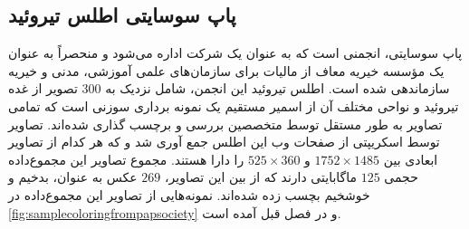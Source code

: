 \subsection{پاپ سوسایتی اطلس تیروئید}\label{subsec:پاپ-سوسایتی}
پاپ سوسایتی، انجمنی است که به عنوان یک شرکت اداره می‌شود و منحصراً به عنوان یک مؤسسه خیریه معاف از مالیات برای سازمان‌های علمی آموزشی، مدنی و خیریه سازماندهی شده است.
اطلس تیروئید این انجمن\cite{papsocietyiamgeatlas}، شامل نزدیک به 300 تصویر از غده تیروئید و نواحی مختلف آن از اسمیر مستقیم یک نمونه برداری سوزنی است که تمامی تصاویر به طور مستقل توسط متخصصین بررسی و برچسب گذاری شده‌اند.
تصاویر توسط اسکریپتی از صفحات وب این اطلس جمع آوری شد و که هر کدام از تصاویر ابعادی بین
 $1752\times1485$
 و
 $525\times360$
 را دارا هستند.
مجموع تصاویر این مجموع‌داده حجمی $125$ ماگابایتی دارند که از بین این تصاویر، $269$ عکس به عنوان، بدخیم و خوشخیم بچسب زده شده‌اند.
نمونه‌هایی از تصاویر این مجموع‌داده در \ref{fig:samplecoloringfrompapsociety}  و در فصل قبل آمده است.
